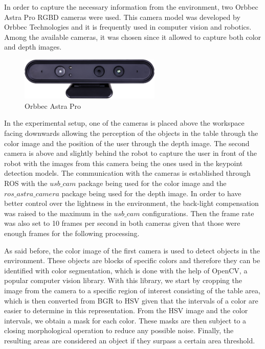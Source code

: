 
In order to capture the necessary information from the environment, two Orbbec Astra Pro RGBD cameras were used. This camera model was developed by Orbbec Technologies and it is frequently used in computer vision and robotics\cite{AstraPro}. Among the available cameras, it was chosen since it allowed to capture both color and depth images.

\begin{figure}[h]
\centerline{\includegraphics[width=0.6\textwidth]{figs/Astra.jpg}}
\caption[Orbbec Astra Pro]{Orbbec Astra Pro \cite{AstraPro}}
\label{fig:orbbec_astra_pro}
\end{figure}

In the experimental setup, one of the cameras is placed above the workspace facing downwards allowing the perception of the objects in the table through the color image and the position of the user through the depth image. The second camera is above and slightly behind the robot to capture the user in front of the robot with the images from this camera being the ones used in the keypoint detection models. The communication with the cameras is established through ROS with the $usb\_cam$ package being used for the color image and the $ros\_astra\_camera$ package being used for the depth image. In order to have better control over the lightness in the environment, the back-light compensation was raised to the maximum in the $usb\_cam$ configurations. Then the frame rate was also set to 10 frames per second in both cameras given that those were enough frames for the following processing.

As said before, the color image of the first camera is used to detect objects in the environment. These objects are blocks of specific colors and therefore they can be identified with color segmentation, which is done with the help of OpenCV, a popular computer vision library. With this library, we start by cropping the image from the camera to a specific region of interest consisting of the table area, which is then converted from BGR to HSV given that the intervals of a color are easier to determine in this representation. From the HSV image and the color intervals, we obtain a mask for each color. These masks are then subject to a closing morphological operation to reduce any possible noise. Finally, the resulting areas are considered an object if they surpass a certain area threshold.

